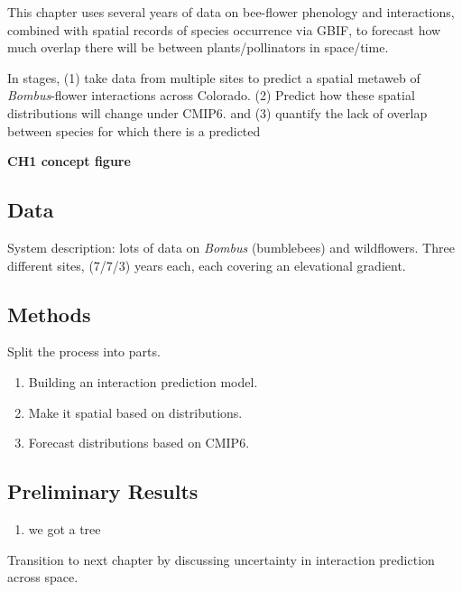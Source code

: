 \documentclass[11pt]{article}
\begin{document}
This chapter uses several years of data on bee-flower phenology and
interactions, combined with spatial records of species occurrence via
GBIF, to forecast how much overlap there will be between
plants/pollinators in space/time.

In stages, (1) take data from multiple sites to predict a spatial
metaweb of \emph{Bombus}-flower interactions across Colorado. (2)
Predict how these spatial distributions will change under CMIP6. and (3)
quantify the lack of overlap between species for which there is a
predicted

\textbf{CH1 concept figure}

\hypertarget{data}{%
\subsection{Data}\label{data}}

System description: lots of data on \emph{Bombus} (bumblebees) and
wildflowers. Three different sites, (7/7/3) years each, each covering an
elevational gradient.

\hypertarget{methods}{%
\subsection{Methods}\label{methods}}

Split the process into parts.

\begin{enumerate}
\def\labelenumi{\arabic{enumi})}
\tightlist
\item
  Building an interaction prediction model.
\item
  Make it spatial based on distributions.
\item
  Forecast distributions based on CMIP6.
\end{enumerate}

\hypertarget{preliminary-results}{%
\subsection{Preliminary Results}\label{preliminary-results}}

\begin{enumerate}
\def\labelenumi{\arabic{enumi})}
\tightlist
\item
  we got a tree
\end{enumerate}

Transition to next chapter by discussing uncertainty in interaction
prediction across space.
\end{document}

